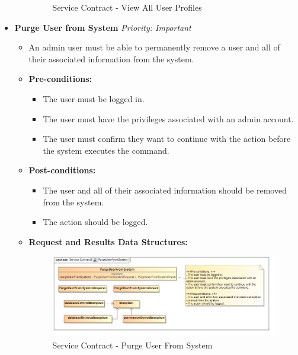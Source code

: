 \documentclass{article}
\begin{document}
\begin{itemize}
\begin{itemize}
\begin{figure}[H]
							\caption{Service Contract - View All User Profiles}
						\end{figure}
					\end{itemize}
					
					\cleardoublepage
					\item \textbf{Purge User from System} \hfill \textit{Priority: Important}
					\begin{itemize}
						\item An admin user must be able to permanently remove a user and all of their associated information from the system.
						\item \textbf{Pre-conditions:}
						\begin{itemize}
							\item The user must be logged in.
							\item The user must have the privileges associated with an admin account.
							\item The user must confirm they want to continue with the action before the system executes the command.
						\end{itemize}
						\item \textbf{Post-conditions:}
						\begin{itemize}
							\item The user and all of their associated information should be removed from the system.
							\item The action should be logged.
						\end{itemize}
						\item \textbf{Request and Results Data Structures:}
						\begin{figure}[H]
							\includegraphics[width=\linewidth]{../Diagrams/ServiceContracts/User subsystem/PurgeUserFromSystem.jpg}
							\caption{Service Contract - Purge User From System}
						\end{figure}
					\end{itemize}
					

\end{itemize}
\end{document}
